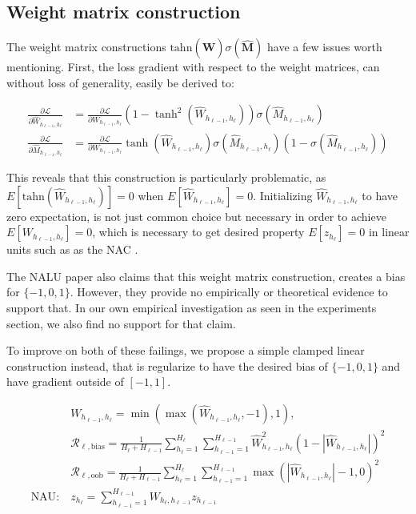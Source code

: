 \subsection{Weight matrix construction}

The weight matrix constructions $\mathrm{tahn}({\hat{\mathbf{W}}}) \sigma({\hat{\mathbf{M}}})$ have a few issues worth mentioning. First, the loss gradient with respect to the weight matrices, can without loss of generality, easily be derived to:

\begin{equation}
\begin{aligned}
\frac{\partial \mathcal{L}}{\partial \hat{W}_{h_{\ell-1},h_\ell}} &= \frac{\partial \mathcal{L}}{\partial W_{h_{\ell-1},h_\ell}} (1 - \tanh^2(\hat{W}_{h_{\ell-1},h_\ell})) \sigma(\hat{M}_{h_{\ell-1},h_\ell}) \\
\frac{\partial \mathcal{L}}{\partial \hat{M}_{h_{\ell-1},h_\ell}} &= \frac{\partial \mathcal{L}}{\partial W_{h_{\ell-1},h_\ell}} \tanh(\hat{W}_{h_{\ell-1},h_\ell}) \sigma(\hat{M}_{h_{\ell-1},h_\ell}) (1 - \sigma(\hat{M}_{h_{\ell-1},h_\ell}))
\end{aligned}
\end{equation}

This reveals that this construction is particularly problematic, as $E[\mathrm{tahn}(\hat{W}_{h_{\ell-1},h_\ell})] = 0$ when $E[\hat{W}_{h_{\ell-1},h_\ell}] = 0$. Initializing $\hat{W}_{h_{\ell-1},h_\ell}$ to have zero expectation, is not just common choice but necessary in order to achieve $E[W_{h_{\ell-1},h_\ell}] = 0$, which is necessary to get desired property $E[z_{h_\ell}] = 0$ in linear units such as as the NAC \cite{glorot-initialization}.

The NALU \cite{trask-nalu} paper also claims that this weight matrix construction, creates a bias for $\{-1, 0, 1\}$. However, they provide no empirically or theoretical evidence to support that. In our own empirical investigation as seen in the experiments section, we also find no support for that claim.

To improve on both of these failings, we propose a simple clamped linear construction instead, that is regularize to have the desired bias of $\{-1, 0, 1\}$ and have gradient outside of $[-1, 1]$.

\begin{equation}
\begin{aligned}
&W_{h_{\ell-1},h_\ell} = \min(\max(\hat{W}_{h_{\ell-1},h_\ell}, -1), 1), \\
&\mathcal{R}_{\ell,\mathrm{bias}} = \frac{1}{H_\ell + H_{\ell-1}} \sum_{h_\ell=1}^{H_\ell} \sum_{h_{\ell-1}=1}^{H_{\ell-1}} \hat{W}_{h_{\ell-1},h_\ell}^2 (1 - |\hat{W}_{h_{\ell-1},h_\ell}|)^2 \\
&\mathcal{R}_{\ell,\mathrm{oob}} = \frac{1}{H_\ell + H_{\ell-1}} \sum_{h_\ell=1}^{H_\ell} \sum_{h_{\ell-1}=1}^{H_{\ell-1}} \max(|\hat{W}_{h_{\ell-1},h_\ell}| - 1, 0)^2 \\
\textrm{NAU}:\ &z_{h_\ell} = \sum_{h_{\ell-1}=1}^{H_{\ell-1}} W_{h_{\ell}, h_{\ell-1}} z_{h_{\ell-1}} \\\end{aligned}
\end{equation}

